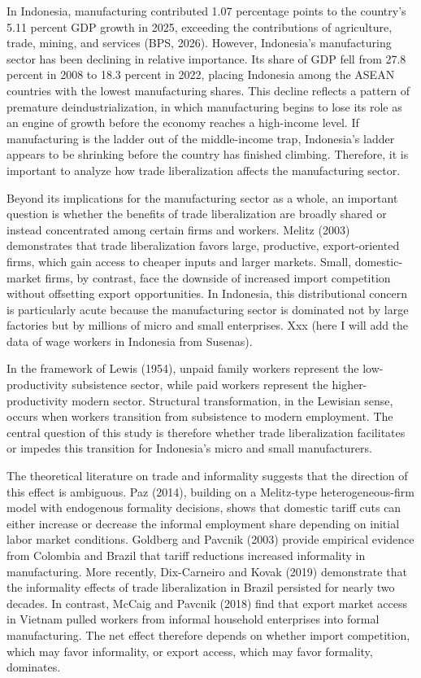 \documentclass[
  manuscript=article,
  layout=publish,
  year=2026,
  volume=1,
]{den}
\begin{document}
In Indonesia, manufacturing contributed 1.07 percentage points to the
country's 5.11 percent GDP growth in 2025, exceeding the contributions
of agriculture, trade, mining, and services (BPS, 2026). However,
Indonesia's manufacturing sector has been declining in relative
importance. Its share of GDP fell from 27.8 percent in 2008 to 18.3
percent in 2022, placing Indonesia among the ASEAN countries with the
lowest manufacturing shares. This decline reflects a pattern of
premature deindustrialization, in which manufacturing begins to lose its
role as an engine of growth before the economy reaches a high-income
level. If manufacturing is the ladder out of the middle-income trap,
Indonesia's ladder appears to be shrinking before the country has
finished climbing. Therefore, it is important to analyze how trade
liberalization affects the manufacturing sector.

Beyond its implications for the manufacturing sector as a whole, an
important question is whether the benefits of trade liberalization are
broadly shared or instead concentrated among certain firms and workers.
Melitz (2003) demonstrates that trade liberalization favors large,
productive, export-oriented firms, which gain access to cheaper inputs
and larger markets. Small, domestic-market firms, by contrast, face the
downside of increased import competition without offsetting export
opportunities. In Indonesia, this distributional concern is particularly
acute because the manufacturing sector is dominated not by large
factories but by millions of micro and small enterprises. Xxx (here I
will add the data of wage workers in Indonesia from Susenas).

In the framework of Lewis (1954), unpaid family workers represent the
low-productivity subsistence sector, while paid workers represent the
higher-productivity modern sector. Structural transformation, in the
Lewisian sense, occurs when workers transition from subsistence to
modern employment. The central question of this study is therefore
whether trade liberalization facilitates or impedes this transition for
Indonesia's micro and small manufacturers.

The theoretical literature on trade and informality suggests that the
direction of this effect is ambiguous. Paz (2014), building on a
Melitz-type heterogeneous-firm model with endogenous formality
decisions, shows that domestic tariff cuts can either increase or
decrease the informal employment share depending on initial labor market
conditions. Goldberg and Pavcnik (2003) provide empirical evidence from
Colombia and Brazil that tariff reductions increased informality in
manufacturing. More recently, Dix-Carneiro and Kovak (2019) demonstrate
that the informality effects of trade liberalization in Brazil persisted
for nearly two decades. In contrast, McCaig and Pavcnik (2018) find that
export market access in Vietnam pulled workers from informal household
enterprises into formal manufacturing. The net effect therefore depends
on whether import competition, which may favor informality, or export
access, which may favor formality, dominates.
\end{document}
